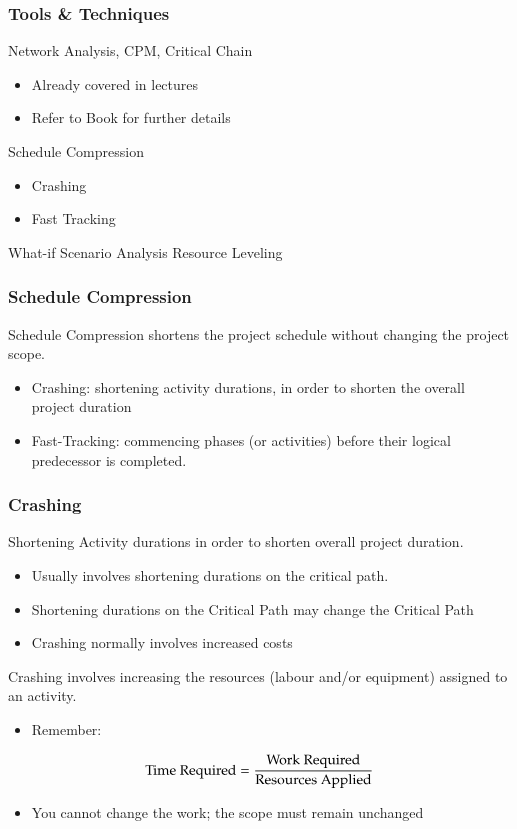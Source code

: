 \begin{frame}
\frametitle{Tools \& Techniques}
Network Analysis, CPM, Critical Chain
\begin{itemize}
	\item Already covered in lectures
	\item Refer to Book for further details
\end{itemize}
Schedule Compression
\begin{itemize}
	\item Crashing
	\item Fast Tracking
\end{itemize}
What-if Scenario Analysis
Resource Leveling

\end{frame}




\begin{frame}
\frametitle{Schedule Compression}
Schedule Compression shortens the project schedule without changing the project scope.
\begin{itemize}
	\item Crashing:  shortening activity durations, in order to shorten the overall project duration
	\item Fast-Tracking: commencing phases (or activities) before their logical predecessor is completed.
\end{itemize}
\end{frame}




\begin{frame}
\frametitle{Crashing}
Shortening Activity durations in order to shorten overall project duration.
\begin{itemize}
	\item Usually involves shortening durations on the critical path.
	\item Shortening durations on the Critical Path may change the Critical Path
	\item Crashing normally involves increased costs
\end{itemize}
Crashing involves increasing the resources (labour and/or equipment) assigned to an activity.
\begin{itemize}
	\item Remember:
\end{itemize}


\begin{equation}
\mbox{Time Required} = \frac{\mbox{Work Required}}{\mbox{Resources Applied}}   \notag
\end{equation}

\begin{itemize}
	\item You cannot change the work; the scope must remain unchanged
\end{itemize}
\end{frame}




